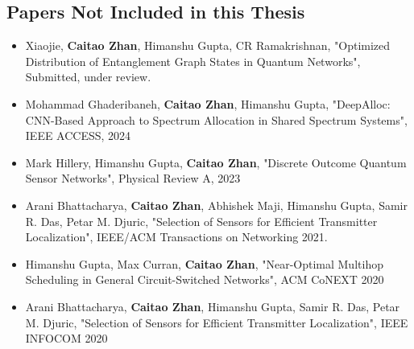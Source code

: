 \subsection*{Papers Not Included in this Thesis}
\begin{itemize}

    \item Xiaojie, \textbf{Caitao Zhan}, Himanshu Gupta, CR Ramakrishnan, "Optimized Distribution of Entanglement Graph States in Quantum Networks", Submitted, under review.

    \item Mohammad Ghaderibaneh, \textbf{Caitao Zhan}, Himanshu Gupta, "DeepAlloc: CNN-Based Approach to Spectrum Allocation in Shared Spectrum Systems", IEEE ACCESS, 2024

    \item Mark Hillery, Himanshu Gupta, \textbf{Caitao Zhan}, "Discrete Outcome Quantum Sensor Networks", Physical Review A, 2023

    \item Arani Bhattacharya, \textbf{Caitao Zhan}, Abhishek Maji, Himanshu Gupta, Samir R. Das, Petar M. Djuric, "Selection of Sensors for Efficient Transmitter Localization", IEEE/ACM Transactions on Networking 2021.

    \item Himanshu Gupta, Max Curran, \textbf{Caitao Zhan}, "Near-Optimal Multihop Scheduling in General Circuit-Switched Networks", ACM CoNEXT 2020
    
    \item Arani Bhattacharya, \textbf{Caitao Zhan}, Himanshu Gupta, Samir R. Das, Petar M. Djuric, "Selection of Sensors for Efficient Transmitter Localization", IEEE INFOCOM 2020
  
\end{itemize}

